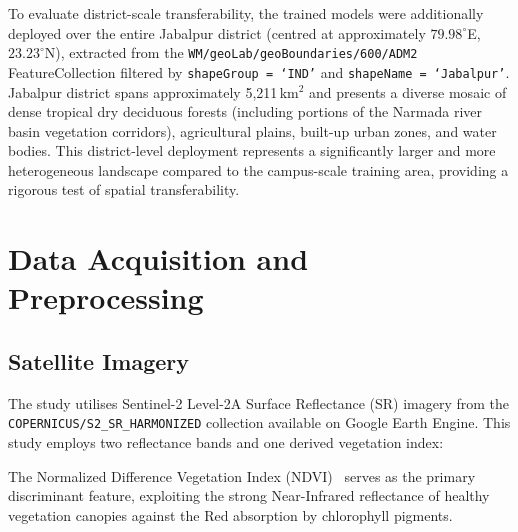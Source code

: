 \documentclass[12pt, a4paper, twocolumn]{article}
\begin{document}
To evaluate district-scale transferability, the trained models were additionally deployed over the entire Jabalpur district (centred at approximately $79.98^{\circ}$E, $23.23^{\circ}$N), extracted from the \texttt{WM/geoLab/geoBoundaries/600/ADM2} FeatureCollection filtered by \texttt{shapeGroup = `IND'} and \texttt{shapeName = `Jabalpur'}. Jabalpur district spans approximately 5,211\,km$^2$ and presents a diverse mosaic of dense tropical dry deciduous forests (including portions of the Narmada river basin vegetation corridors), agricultural plains, built-up urban zones, and water bodies. This district-level deployment represents a significantly larger and more heterogeneous landscape compared to the campus-scale training area, providing a rigorous test of spatial transferability.

\section{Data Acquisition and Preprocessing}
\label{sec:data}

\subsection{Satellite Imagery}

The study utilises Sentinel-2 Level-2A Surface Reflectance (SR) imagery from the \texttt{COPERNICUS/S2\_SR\_HARMONIZED} collection available on Google Earth Engine. This study employs two reflectance bands and one derived vegetation index:

\begin{table}[H]
\centering
\caption{Spectral features used for classification.}
\label{tab:bands}
\end{table}

The Normalized Difference Vegetation Index (NDVI)~\cite{rouse1974monitoring} serves as the primary discriminant feature, exploiting the strong Near-Infrared reflectance of healthy vegetation canopies against the Red absorption by chlorophyll pigments.
\end{document}
